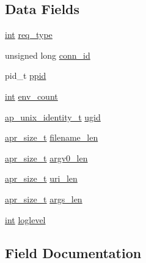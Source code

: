 \subsection*{Data Fields}
\begin{DoxyCompactItemize}
\item 
\hyperlink{pcre_8txt_a42dfa4ff673c82d8efe7144098fbc198}{int} \hyperlink{structcgid__req__t_aaf063f26171b6f08dbddc339146e50d9}{req\+\_\+type}
\item 
unsigned long \hyperlink{structcgid__req__t_a79627975f6ca8575d0b81a42c34ce971}{conn\+\_\+id}
\item 
pid\+\_\+t \hyperlink{structcgid__req__t_ab7bb2bf4887a7648d5d9a7dce0e015ec}{ppid}
\item 
\hyperlink{pcre_8txt_a42dfa4ff673c82d8efe7144098fbc198}{int} \hyperlink{structcgid__req__t_a57c68ee896f5fe333948671ac9b826d6}{env\+\_\+count}
\item 
\hyperlink{structap__unix__identity__t}{ap\+\_\+unix\+\_\+identity\+\_\+t} \hyperlink{structcgid__req__t_a68ba007c3f944b55e00a672028080f5e}{ugid}
\item 
\hyperlink{group__apr__platform_gaaa72b2253f6f3032cefea5712a27540e}{apr\+\_\+size\+\_\+t} \hyperlink{structcgid__req__t_a8010340caa335a8333909a4ab5b8eff3}{filename\+\_\+len}
\item 
\hyperlink{group__apr__platform_gaaa72b2253f6f3032cefea5712a27540e}{apr\+\_\+size\+\_\+t} \hyperlink{structcgid__req__t_a584163e38c2f5ff8ed3a82137ac895cd}{argv0\+\_\+len}
\item 
\hyperlink{group__apr__platform_gaaa72b2253f6f3032cefea5712a27540e}{apr\+\_\+size\+\_\+t} \hyperlink{structcgid__req__t_ac063763f9087be8b770c195feb56129f}{uri\+\_\+len}
\item 
\hyperlink{group__apr__platform_gaaa72b2253f6f3032cefea5712a27540e}{apr\+\_\+size\+\_\+t} \hyperlink{structcgid__req__t_a460917d56f69c55444b014cb76214157}{args\+\_\+len}
\item 
\hyperlink{pcre_8txt_a42dfa4ff673c82d8efe7144098fbc198}{int} \hyperlink{structcgid__req__t_aea88179740854cf56d494c28870518dc}{loglevel}
\end{DoxyCompactItemize}


\subsection{Field Documentation}
